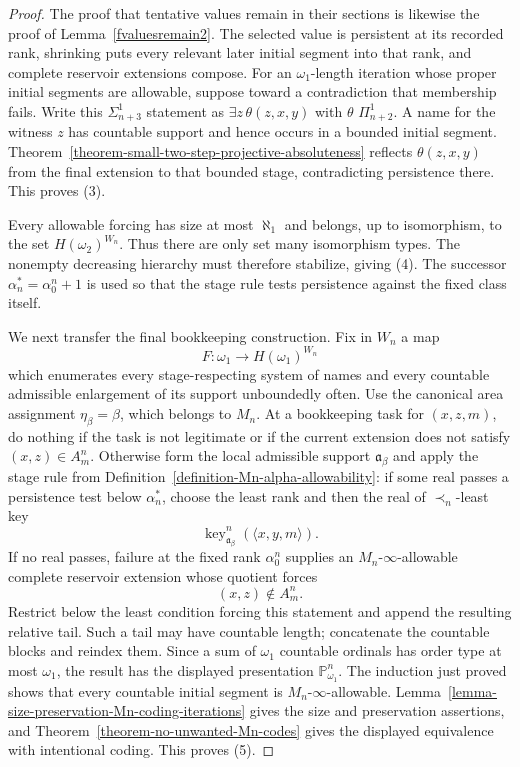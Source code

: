 \documentclass[a4paper,11pt]{article}
\newcommand{\forceP}{\mathbb{P}}
\newcommand{\key}{\operatorname{key}}
\begin{document}
\begin{proof}
The proof that tentative values remain in their sections is likewise the
proof of Lemma~\ref{fvaluesremain2}.  The selected value is persistent at its
recorded rank, shrinking puts every relevant later initial segment into that
rank, and complete reservoir extensions compose.  For an $\omega_1$-length
iteration whose proper initial segments are allowable, suppose toward a contradiction that membership fails.
Write this $\Sigma^1_{n+3}$ statement as
$\exists z\,\theta(z,x,y)$ with $\theta$ $\Pi^1_{n+2}$.  A name for the
witness $z$ has countable support and hence occurs in a bounded initial
segment.  Theorem~\ref{theorem-small-two-step-projective-absoluteness}
reflects $\theta(z,x,y)$ from the final extension to that bounded stage,
contradicting persistence there.  This proves (3).

Every allowable forcing has size at most $\aleph_1$ and belongs, up to
isomorphism, to the set $H(\omega_2)^{W_n}$.  Thus there are only set many
isomorphism types.  The nonempty decreasing hierarchy must therefore
stabilize, giving (4).  The successor $\alpha_n^\ast=\alpha^n_0+1$ is used so
that the stage rule tests persistence against the fixed class itself.

We next transfer the final bookkeeping construction.  Fix in $W_n$ a map
\[
   F:\omega_1\longrightarrow H(\omega_1)^{W_n}
\]
which enumerates every stage-respecting system of names and every countable
admissible enlargement of its support unboundedly often.  Use the canonical
area assignment $\eta_\beta=\beta$, which belongs to $M_n$.  At a bookkeeping
task for $(x,z,m)$, do nothing if the task is not legitimate or if the current
extension does not satisfy $(x,z)\in A^n_m$.  Otherwise form the local
admissible support $\mathfrak a_\beta$ and apply the stage rule from
Definition~\ref{definition-Mn-alpha-allowability}: if some real passes a
persistence test below $\alpha_n^\ast$, choose the least rank and then the
real of $\prec_n$-least key
\[
   \key^n_{\mathfrak a_\beta}(\langle x,y,m\rangle).
\]
If no real passes, failure at the fixed rank $\alpha^n_0$ supplies an
$M_n$-$\infty$-allowable complete reservoir extension whose quotient forces
\[
   (x,z)\notin A^n_m.
\]
Restrict below the least condition forcing this statement and append the
resulting relative tail.  Such a tail may have countable length; concatenate
the countable blocks and reindex them.  Since a sum of $\omega_1$ countable
ordinals has order type at most $\omega_1$, the result has the displayed
presentation $\forceP^n_{\omega_1}$.  The induction just proved
shows that every countable initial segment is $M_n$-$\infty$-allowable.
Lemma~\ref{lemma-size-preservation-Mn-coding-iterations} gives the size and
preservation assertions, and
Theorem~\ref{theorem-no-unwanted-Mn-codes} gives the displayed equivalence
with intentional coding.  This proves (5).


\end{proof}
\end{document}
